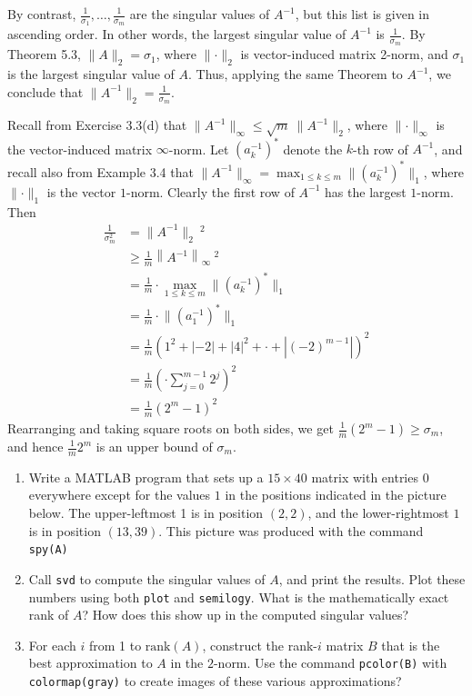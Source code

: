 \documentclass[12pt]{article}
\newenvironment{ex}[2][Exercise]{\begin{trivlist}
		\item[\hskip \labelsep {\bfseries #1}\hskip \labelsep {\bfseries #2.}]}{\end{trivlist}}
\newenvironment{sol}[1][Solution]{\begin{trivlist}
		\item[\hskip \labelsep {\bfseries #1:}]}{\end{trivlist}}
\begin{document}
\begin{sol}
\begin{enumerate}[label=(\alph*)]
		
		By contrast, $\frac{1}{\sigma_1},\ldots,\frac{1}{\sigma_m}$ are the singular values of $A^{-1}$,
		but this list is given in ascending order. In other words, the largest  singular value of
		$A^{-1}$ is $\frac{1}{\sigma_m}$. By Theorem 5.3, $\lVert A\rVert_2=\sigma_1$, where $\lVert\cdot\rVert_2$
		is vector-induced matrix 2-norm, and $\sigma_1$ is the largest singular value of $A$. Thus,
		applying the same Theorem to $A^{-1}$, we conclude that $\lVert A^{-1}\rVert_2 =\frac{1}{\sigma_m}$.
		
		Recall from Exercise 3.3(d) that $\lVert A^{-1}\rVert_\infty\leq \sqrt{m}\ \lVert A^{-1}\rVert_2$,
		where $\lVert \cdot \rVert_\infty$ is the vector-induced matrix $\infty$-norm.
		Let $(a^{-1}_k)^*$ denote the $k$-th row of $A^{-1}$, and recall also from Example 3.4 that
		$\lVert A^{-1}\rVert_\infty=\max_{1\leq k\leq m}\lVert (a^{-1}_k)^*\rVert_1$, where
		$\lVert \cdot\rVert_1$ is the vector $1$-norm. Clearly the first row of $A^{-1}$ has the
		largest $1$-norm. Then
		\begin{align*}
			\frac{1}{\sigma_m^2}&=\lVert A^{-1}\rVert_2\ ^2\\
			&\geq \frac{1}{m}\left\lVert A^{-1}\right\rVert_\infty\ ^2\\
			&=\frac{1}{m}\cdot \max_{1\leq k\leq m}\lVert (a_k^{-1})^*\rVert_1\\
			&=\frac{1}{m}\cdot \lVert (a_1^{-1})^*\rVert_1\\
			&=\frac{1}{m}\left(1^2 + |-2| + |4|^2+\cdot+|(-2)^{m-1}|\right)^2\\
			&=\frac{1}{m}\left(\cdot \sum_{j=0}^{m-1}2^j\right)^2\\
			&=\frac{1}{m}(2^m-1)^2
		\end{align*}
		Rearranging and taking square roots on both sides, we get $\frac{1}{m}(2^m-1)\geq \sigma_m$,
		and hence $\frac{1}{m}2^m$ is an upper bound of $\sigma_m$.
	\end{enumerate}
\end{sol}

\begin{ex}{3}
	\begin{enumerate}[label=(\alph*)]
		\item Write a MATLAB program that sets up a $15\times 40$ matrix with entries 0 everywhere except
		for the values $1$ in the positions indicated in the picture below. The upper-leftmost 1 is in
		position $(2,2)$, and the lower-rightmost $1$ is in position $(13,39)$. This picture was produced
		with the command \texttt{spy(A)}
		\item Call \texttt{svd} to compute the singular values of $A$, and print the results. Plot these
		numbers using both \texttt{plot} and \texttt{semilogy}. What is the mathematically exact rank of
		$A$? How does this show up in the computed singular values?
		\item For each $i$ from 1 to $\text{rank}(A)$, construct the rank-$i$ matrix $B$ that is the best
		approximation to $A$ in the $2$-norm. Use the command \texttt{pcolor(B)} with \texttt{colormap(gray)}
		to create images of these various approximations?
	\end{enumerate}
\end{ex}
\end{document}
